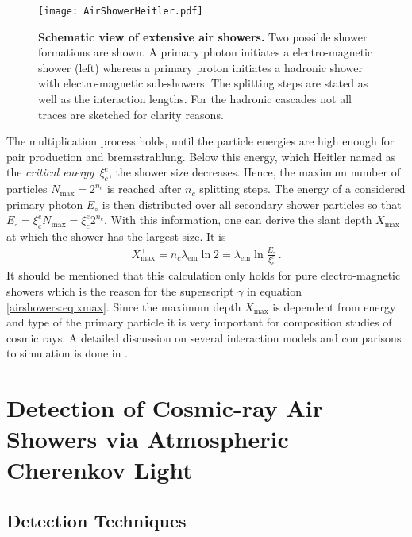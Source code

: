 \begin{figure}[h]
	\texttt{[image: AirShowerHeitler.pdf]}
	\caption[Schematic view of extensive air showers]{\textbf{Schematic view of extensive air showers.} \cite{famous:niggemann} Two possible shower formations are shown. A primary photon initiates a electro-magnetic shower (left) whereas a primary proton initiates a hadronic shower with electro-magnetic sub-showers. The splitting steps are stated as well as the interaction lengths. For the hadronic cascades not all traces are sketched for clarity reasons.}	
	\label{airshowers:cascades}
\end{figure}

The multiplication process holds, until the particle energies are high enough for pair production and bremsstrahlung. Below this energy, which Heitler named as the \textit{critical energy}~$\xi_c^e$, the shower size decreases. Hence, the maximum number of particles $N_\text{max} = 2^{n_c}$ is reached after $n_c$ splitting steps. The energy of a considered primary photon $E_\circ$ is then distributed over all secondary shower particles so that $E_\circ = \xi_c^e N_\text{max} = \xi_c^e 2^{n_c}$. With this information, one can derive the slant depth $X_\text{max}$ at which the shower has the largest size. It is
\begin{align}
	X_\text{max}^\gamma = n_c\lambda_\text{em}\ln{2} = \lambda_\text{em}\ln{\frac{E_\circ}{\xi_c^e}}\,.
	\label{airshowers:eq:xmax}
\end{align}
It should be mentioned that this calculation only holds for pure electro-magnetic showers which is the reason for the superscript $\gamma$ in equation \eqref{airshowers:eq:xmax}. \cite{airshowers:heitlermodel}
Since the maximum depth $X_\text{max}$ is dependent from energy and type of the primary particle it is very important for composition studies of cosmic rays. A detailed discussion on several interaction models and comparisons to simulation is done in \cite{airshowers:heitlermodel}.

\section{Detection of Cosmic-ray Air Showers via Atmospheric Cherenkov Light}\label{sec:cherenkov}

\subsection{Detection Techniques}

